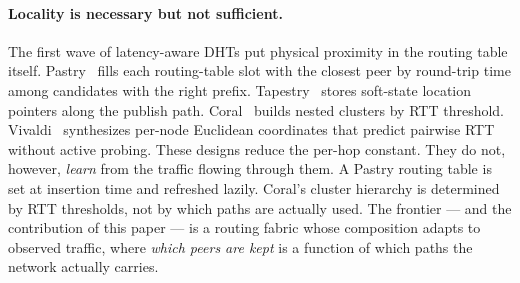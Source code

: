 \documentclass[conference]{IEEEtran}
\begin{document}
\paragraph{Locality is necessary but not sufficient.}
The first wave of latency-aware DHTs put physical proximity in
the routing table itself.  Pastry~\cite{rowstron2001pastry} fills
each routing-table slot with the closest peer by round-trip time
among candidates with the right prefix.
Tapestry~\cite{zhao2004tapestry} stores soft-state location
pointers along the publish path.  Coral~\cite{freedman2004coral}
builds nested clusters by RTT threshold.
Vivaldi~\cite{dabek2004vivaldi} synthesizes per-node Euclidean
coordinates that predict pairwise RTT without active probing.
These designs reduce the per-hop constant.  They do not, however,
\emph{learn} from the traffic flowing through them.  A Pastry
routing table is set at insertion time and refreshed lazily.
Coral's cluster hierarchy is determined by RTT thresholds, not
by which paths are actually used.  The frontier --- and the
contribution of this paper --- is a routing fabric whose
composition adapts to observed traffic, where \emph{which peers
are kept} is a function of which paths the network actually
carries.
\end{document}
